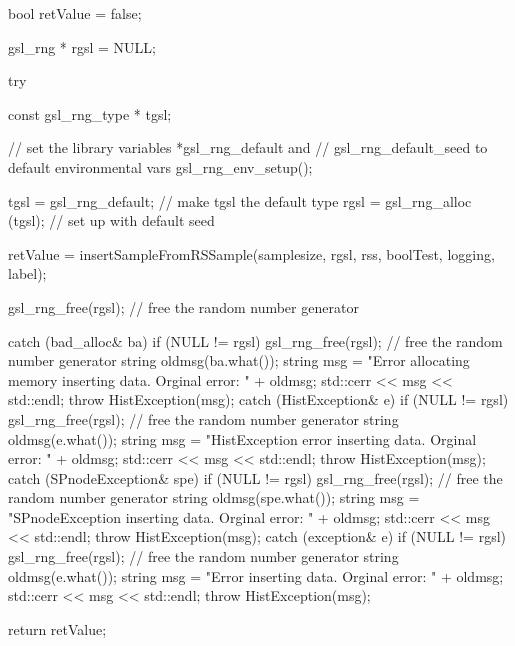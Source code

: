 \begin{DoxyCode}
{
    bool retValue = false;

    gsl_rng * rgsl = NULL;

    try {

        const gsl_rng_type * tgsl;

        // set the library variables *gsl_rng_default and
        // gsl_rng_default_seed to default environmental vars
        gsl_rng_env_setup();

        tgsl = gsl_rng_default; // make tgsl the default type
        rgsl = gsl_rng_alloc (tgsl); // set up with default seed

        retValue = insertSampleFromRSSample(samplesize, rgsl, rss, boolTest,
                logging, label);

        gsl_rng_free(rgsl); // free the random number generator
    }

    catch (bad_alloc& ba) {
        if (NULL != rgsl) gsl_rng_free(rgsl); // free the random number
       generator
        string oldmsg(ba.what());
        string msg = "Error allocating memory inserting data.  Orginal error: "
                                            + oldmsg;
        std::cerr << msg << std::endl;
        throw HistException(msg);
    }
    catch (HistException& e) {
        if (NULL != rgsl) gsl_rng_free(rgsl); // free the random number
       generator
        string oldmsg(e.what());
        string msg = "HistException error inserting data.  Orginal error: "
                                    + oldmsg;
        std::cerr << msg << std::endl;
        throw HistException(msg);
    }
    catch (SPnodeException& spe) {
        if (NULL != rgsl) gsl_rng_free(rgsl); // free the random number
       generator
        string oldmsg(spe.what());
        string msg = "SPnodeException inserting data.  Orginal error: " + 
      oldmsg;
        std::cerr << msg << std::endl;
        throw HistException(msg);
    }
    catch (exception& e) {
        if (NULL != rgsl) gsl_rng_free(rgsl); // free the random number
       generator
        string oldmsg(e.what());
        string msg = "Error inserting data.  Orginal error: " + oldmsg;
        std::cerr << msg << std::endl;
        throw HistException(msg);
    }

    return retValue;
}
\end{DoxyCode}
